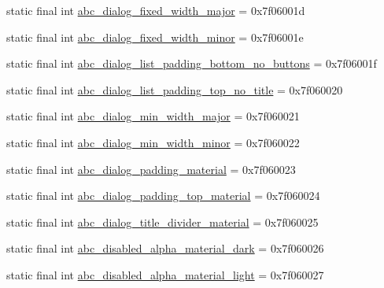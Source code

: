 \begin{DoxyCompactItemize}
static final int \mbox{\hyperlink{classandroid_1_1support_1_1v7_1_1appcompat_1_1R_1_1dimen_ad7f6e116c04d41cc7d5d1f9bf0e4038b}{abc\+\_\+dialog\+\_\+fixed\+\_\+width\+\_\+major}} = 0x7f06001d
\item 
static final int \mbox{\hyperlink{classandroid_1_1support_1_1v7_1_1appcompat_1_1R_1_1dimen_ad07ecaf57a71a1c011ce1210ede9172f}{abc\+\_\+dialog\+\_\+fixed\+\_\+width\+\_\+minor}} = 0x7f06001e
\item 
static final int \mbox{\hyperlink{classandroid_1_1support_1_1v7_1_1appcompat_1_1R_1_1dimen_ab6eb7cc44d3b3567eddb0926f8ecf55e}{abc\+\_\+dialog\+\_\+list\+\_\+padding\+\_\+bottom\+\_\+no\+\_\+buttons}} = 0x7f06001f
\item 
static final int \mbox{\hyperlink{classandroid_1_1support_1_1v7_1_1appcompat_1_1R_1_1dimen_a6855c6c40caa3ecd4488943c4a92ec3f}{abc\+\_\+dialog\+\_\+list\+\_\+padding\+\_\+top\+\_\+no\+\_\+title}} = 0x7f060020
\item 
static final int \mbox{\hyperlink{classandroid_1_1support_1_1v7_1_1appcompat_1_1R_1_1dimen_abfb57f4c014c07b7c96b531d47074c89}{abc\+\_\+dialog\+\_\+min\+\_\+width\+\_\+major}} = 0x7f060021
\item 
static final int \mbox{\hyperlink{classandroid_1_1support_1_1v7_1_1appcompat_1_1R_1_1dimen_ab83da246a302d81238b96aa8902849d5}{abc\+\_\+dialog\+\_\+min\+\_\+width\+\_\+minor}} = 0x7f060022
\item 
static final int \mbox{\hyperlink{classandroid_1_1support_1_1v7_1_1appcompat_1_1R_1_1dimen_ad1288246c4d8bb4e2586275198e17cf2}{abc\+\_\+dialog\+\_\+padding\+\_\+material}} = 0x7f060023
\item 
static final int \mbox{\hyperlink{classandroid_1_1support_1_1v7_1_1appcompat_1_1R_1_1dimen_a679ac16cbd922ac7f229594ceef4692a}{abc\+\_\+dialog\+\_\+padding\+\_\+top\+\_\+material}} = 0x7f060024
\item 
static final int \mbox{\hyperlink{classandroid_1_1support_1_1v7_1_1appcompat_1_1R_1_1dimen_a838daf05d2e6842cb670ded036a9649d}{abc\+\_\+dialog\+\_\+title\+\_\+divider\+\_\+material}} = 0x7f060025
\item 
static final int \mbox{\hyperlink{classandroid_1_1support_1_1v7_1_1appcompat_1_1R_1_1dimen_af692674ee9dd6bfe88f44b3abf41b713}{abc\+\_\+disabled\+\_\+alpha\+\_\+material\+\_\+dark}} = 0x7f060026
\item 
static final int \mbox{\hyperlink{classandroid_1_1support_1_1v7_1_1appcompat_1_1R_1_1dimen_a28eacd87805e60b3350cf55e7e60ff05}{abc\+\_\+disabled\+\_\+alpha\+\_\+material\+\_\+light}} = 0x7f060027

\end{DoxyCompactItemize}

